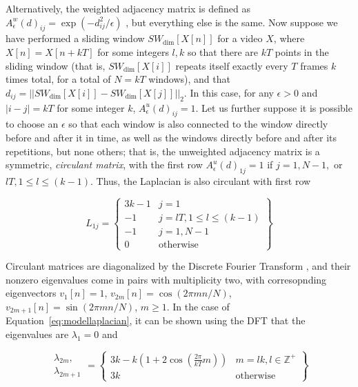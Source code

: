 \documentclass{article}
\begin{document}
Alternatively, the weighted adjacency matrix is defined as $A_{\epsilon}^w(d)_{ij} = \exp(-d_{ij}^2/\epsilon)$ \cite{belkin2003laplacian}, but everything else is the same.  Now suppose we have performed a sliding window $SW_{\text{dim}}[X[n]]$ for a video $X$, where $X[n] = X[n+kT]$ for some integers $l, k$ so that there are $kT$ points in the sliding window (that is, $SW_{\text{dim}}[X[i]]$ repeats itself exactly every $T$ frames $k$ times total, for a total of $N = kT$ windows), and that $d_{ij} = ||SW_{\text{dim}}[X[i]] - SW_{\text{dim}}[X[j]]||_2$.  In this case, for any $\epsilon > 0$ and $|i - j| = kT$ for some integer $k$, $A^u_{\epsilon}(d)_{ij} = 1$.  Let us further suppose it is possible to choose an $\epsilon$ so that each window is also connected to the window directly before and after it in time, as well as the windows directly before and after its repetitions, but none others; that is, the unweighted adjacency matrix is a symmetric, {\em circulant matrix}, with the first row $A_{\epsilon}^u(d)_{1j} = 1$ if $j = 1, N-1,$ or $lT, 1 \leq l \leq (k-1)$.  Thus, the Laplacian is also circulant with first row

\begin{equation}
\label{eq:modellaplacian}
L_{1j} = \left\{ \begin{array}{cc} 3k-1 & j = 1 \\ -1 & j = lT, 1 \leq l \leq (k-1) \\ -1 & j = 1, N-1 \\ 0 & \text{otherwise} \end{array} \right\}
\end{equation}

Circulant matrices are diagonalized by the Discrete Fourier Transform \cite{godsil2013algebraic}, and their nonzero eigenvalues come in pairs with multiplicity two, with corresopnding eigenvectors $v_1[n] = 1$, $v_{2m}[n] = \cos(2 \pi mn / N)$, $v_{2m+1}[n] = \sin(2 \pi m n / N)$, $m \geq 1$.  In the case of Equation~\ref{eq:modellaplacian}, it can be shown using the DFT that the eigenvalues are $\lambda_1 = 0$ and 

\begin{equation}
\begin{array}{cc}\lambda_{2m},\\\lambda_{2m+1}\end{array} = \left\{ \begin{array}{cc} 3k - k\left( 1 + 2 \cos \left( \frac{2 \pi}{kT} m \right) \right) & m = lk, l \in \mathbb{Z}^+ \\ 3k & \text{otherwise}  \end{array} \right\} 
\end{equation}
\end{document}
